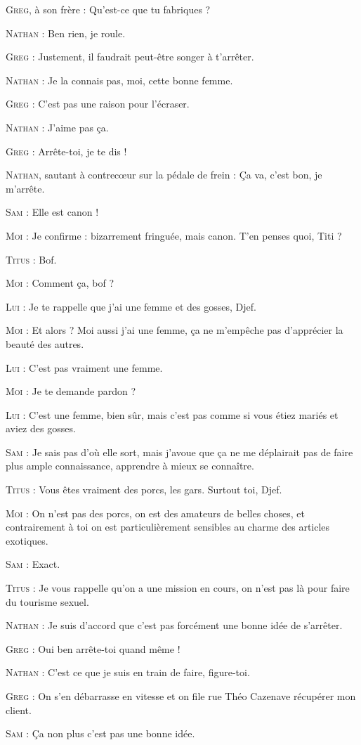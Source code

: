 \begin{dialogue}

\textsc{Greg}, à son frère : Qu’est-ce que tu fabriques ?

\textsc{Nathan} : Ben rien, je roule.

\textsc{Greg} : Justement, il faudrait peut-être songer à t’arrêter.

\textsc{Nathan} : Je la connais pas, moi, cette bonne femme.

\textsc{Greg} : C’est pas une raison pour l’écraser.

\textsc{Nathan} : J’aime pas ça.

\textsc{Greg} : Arrête-toi, je te dis !

\textsc{Nathan}, sautant à contrecœur sur la pédale de frein : Ça va, c’est bon, je m’arrête.

\textsc{Sam} : Elle est canon !

\textsc{Moi} : Je confirme : bizarrement fringuée, mais canon. T’en penses quoi, Titi ?

\textsc{Titus} : Bof.

\textsc{Moi} : Comment ça, bof ?

\textsc{Lui} : Je te rappelle que j’ai une femme et des gosses, Djef.

\textsc{Moi} : Et alors ? Moi aussi j’ai une femme, ça ne m’empêche pas d’apprécier la beauté des autres.

\textsc{Lui} : C’est pas vraiment une femme.

\textsc{Moi} : Je te demande pardon ?

\textsc{Lui} : C’est une femme, bien sûr, mais c’est pas comme si vous étiez mariés et aviez des gosses.

\textsc{Sam} : Je sais pas d’où elle sort, mais j’avoue que ça ne me déplairait pas de faire plus ample connaissance, apprendre à mieux se connaître.

\textsc{Titus} : Vous êtes vraiment des porcs, les gars. Surtout toi, Djef.

\textsc{Moi} : On n’est pas des porcs, on est des amateurs de belles choses, et contrairement à toi on est particulièrement sensibles au charme des articles exotiques.

\textsc{Sam} : Exact.

\textsc{Titus} : Je vous rappelle qu’on a une mission en cours, on n’est pas là pour faire du tourisme sexuel.

\textsc{Nathan} : Je suis d’accord que c’est pas forcément une bonne idée de s’arrêter.

\textsc{Greg} : Oui ben arrête-toi quand même !

\textsc{Nathan} : C’est ce que je suis en train de faire, figure-toi.

\textsc{Greg} : On s’en débarrasse en vitesse et on file rue Théo Cazenave récupérer mon client.

\textsc{Sam} : Ça non plus c’est pas une bonne idée.

\end{dialogue}

